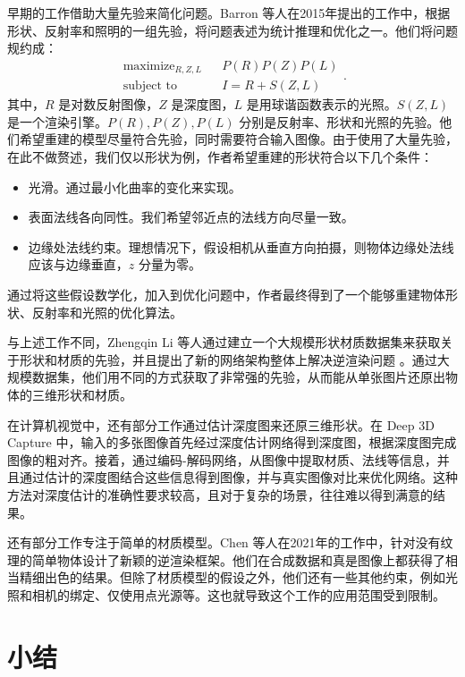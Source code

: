 早期的工作借助大量先验来简化问题。Barron 等人在2015年提出的工作中\cite{SIRS}，根据形状、反射率和照明的一组先验，将问题表述为统计推理和优化之一。他们将问题规约成：
\begin{equation*}
  \begin{array}{ccc}\text{maximize}_{R,Z,L}&&P(R)P(Z)P(L)\\\text{subject to}&&I=R+S(Z,L)\end{array}.
\end{equation*}
其中，$R$ 是对数反射图像，$Z$ 是深度图，$L$ 是用球谐函数表示的光照。$S(Z,L)$是一个渲染引擎。$P(R), P(Z), P(L)$ 分别是反射率、形状和光照的先验。他们希望重建的模型尽量符合先验，同时需要符合输入图像。由于使用了大量先验，在此不做赘述，我们仅以形状为例，作者希望重建的形状符合以下几个条件：
\begin{itemize}
  \item 光滑。通过最小化曲率的变化来实现。
  \item 表面法线各向同性。我们希望邻近点的法线方向尽量一致。
  \item 边缘处法线约束。理想情况下，假设相机从垂直方向拍摄，则物体边缘处法线应该与边缘垂直，$z$ 分量为零。
\end{itemize}
通过将这些假设数学化，加入到优化问题中，作者最终得到了一个能够重建物体形状、反射率和光照的优化算法。

与上述工作不同，Zhengqin Li 等人通过建立一个大规模形状材质数据集来获取关于形状和材质的先验，并且提出了新的网络架构整体上解决逆渲染问题 \cite{Learning1image}。通过大规模数据集，他们用不同的方式获取了非常强的先验，从而能从单张图片还原出物体的三维形状和材质。

在计算机视觉中，还有部分工作通过估计深度图来还原三维形状。在 Deep 3D Capture \cite{D3DC} 中，输入的多张图像首先经过深度估计网络得到深度图，根据深度图完成图像的粗对齐。接着，通过编码-解码网络，从图像中提取材质、法线等信息，并且通过估计的深度图结合这些信息得到图像，并与真实图像对比来优化网络。这种方法对深度估计的准确性要求较高，且对于复杂的场景，往往难以得到满意的结果。

还有部分工作专注于简单的材质模型。Chen 等人在2021年的工作中，针对没有纹理的简单物体设计了新颖的逆渲染框架。他们在合成数据和真是图像上都获得了相当精细出色的结果。但除了材质模型的假设之外，他们还有一些其他约束，例如光照和相机的绑定、仅使用点光源等。这也就导致这个工作的应用范围受到限制。

\section{小结}

